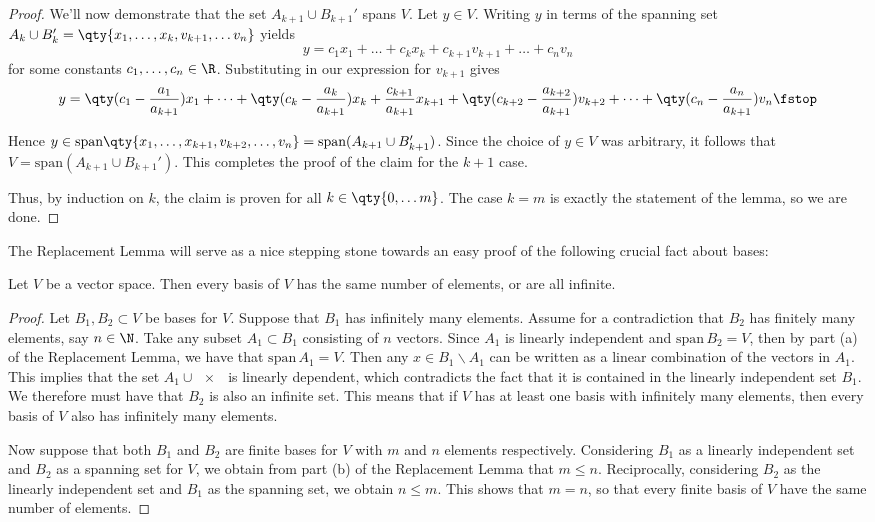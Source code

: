 \begin{proof}
  We'll now demonstrate that the set \( A_{k+1}\cup B_{k+1}' \) spans \( V \). Let \( y\in V \). Writing \( y \) in terms of the spanning set \( A_k\cup B_k'=\qty{x_1,\dots, x_k, v_{k+1},\dots v_n} \) yields
  \[ y=c_1x_1+\dots+c_kx_k+c_{k+1}v_{k+1}+\dots+c_nv_n \]
  for some constants \( c_1,\dots,c_n\in\R \). Substituting in our expression for \( v_{k+1} \) gives
  \[ y=\qty(c_1-\frac{a_{1}}{a_{k+1}})x_1+\dots+ \qty(c_k-\frac{a_{k}}{a_{k+1}})x_k+ \frac{c_{k+1}}{a_{k+1}}x_{k+1}+\qty(c_{k+2}-\frac{a_{k+2}}{a_{k+1}})v_{k+2}+\dots+\qty(c_n-\frac{a_{n}}{a_{k+1}})v_n\fstop \]
  
  Hence \( y\in\text{span}\qty{x_1,\dots,x_{k+1},v_{k+2},\dots,v_n}=\text{span}(A_{k+1}\cup B_{k+1}') \). Since the choice of \( y\in V \) was arbitrary, it follows that \( V=\text{span}(A_{k+1}\cup B_{k+1}') \). This completes the proof of the claim for the \( k+1 \) case.

  \vspace{3mm}

  Thus, by induction on \( k \), the claim is proven for all \( k\in\qty{0,\dots m} \). The case \( k=m \) is exactly the statement of the lemma, so we are done.
\end{proof}

The Replacement Lemma will serve as a nice stepping stone towards an easy proof of the following crucial fact about bases:

\begin{theorem}
  \label{thm:dim}
  Let \( V \) be a vector space. Then every basis of \( V \) has the same number of elements, or are all infinite.
\end{theorem}
\begin{proof}
  Let \( B_1,B_2\subset V \) be bases for \( V \). Suppose that \( B_1 \) has infinitely many elements. Assume for a contradiction that \( B_2 \) has finitely many elements, say \( n\in\N \). Take any subset \( A_1\subset B_1 \) consisting of \( n \) vectors. Since \( A_1 \) is linearly independent and \( \text{span}\,B_2=V \), then by part (a) of the Replacement Lemma, we have that \( \text{span}\,A_1=V \). Then any \( x\in B_1\backslash A_1 \) can be written as a linear combination of the vectors in \( A_1 \). This implies that the set \( A_1\cup\qty{x} \) is linearly dependent, which contradicts the fact that it is contained in the linearly independent set \( B_1 \). We therefore must have that \( B_2 \) is also an infinite set. This means that if \( V \) has at least one basis with infinitely many elements, then every basis of \( V \) also has infinitely many elements.

  \vspace{3mm}

  Now suppose that both \( B_1 \) and \( B_2 \) are finite bases for \( V \) with \( m \) and \( n \) elements respectively. Considering \( B_1 \) as a linearly independent set and \( B_2 \) as a spanning set for \( V \), we obtain from part (b) of the Replacement Lemma that \( m\leq n \). Reciprocally, considering \( B_2 \) as the linearly independent set and \( B_1 \) as the spanning set, we obtain \( n\leq m \). This shows that \( m=n \), so that every finite basis of \( V \) have the same number of elements.
\end{proof}


